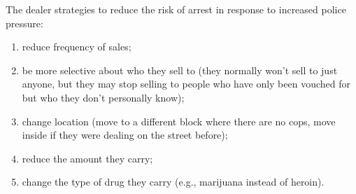 \documentclass[runningheads,a4paper]{llncs}
\begin{document}




%

The dealer strategies to reduce the risk of arrest in response to increased police pressure:

\begin{enumerate}
   \item reduce frequency of sales;
   \item  be more selective about who they sell to (they normally won't sell to just anyone, but they may stop selling to people who have only been vouched for but who they don't personally know);
   \item change location (move to a different block where there are no cops, move inside if they were dealing on the street before);
   \item reduce the amount they carry;
  \item change the type of drug they carry (e.g., marijuana instead of heroin).
\end{enumerate}
\end{document}
